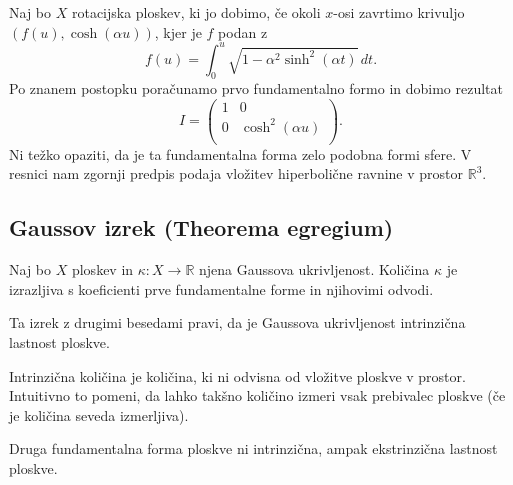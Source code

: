 \begin{primer}
Naj bo $X$ rotacijska ploskev, ki jo dobimo, če okoli $x$-osi zavrtimo krivuljo $(f(u), \cosh (\alpha u))$, kjer je $f$ podan z \begin{equation*}
f(u) = \int_{0}^{u} \sqrt{1 - \alpha^2 \sinh^2(\alpha t)}  \, dt. 
\end{equation*}  
Po znanem postopku poračunamo prvo fundamentalno formo in dobimo rezultat \begin{equation*}
    I = \begin{pmatrix}
        1 & 0\\
        0 & \cosh^2 (\alpha u)\\
    \end{pmatrix}.
\end{equation*}
Ni težko opaziti, da je ta fundamentalna forma zelo podobna formi sfere. V resnici nam zgornji predpis podaja vložitev hiperbolične ravnine v prostor $\mathbb{R}^3$. 
\end{primer}

\subsection{Gaussov izrek (Theorema egregium)}

\begin{izrek}
\label{izr_theorema_egregium}
Naj bo $X$ ploskev in $\kappa: X \to  \mathbb{R}$ njena Gaussova ukrivljenost. Količina $\kappa$ je izrazljiva s koeficienti
prve fundamentalne forme in njihovimi odvodi.
\end{izrek}

\begin{opomba}
Ta izrek z drugimi besedami pravi, da je Gaussova ukrivljenost intrinzična lastnost ploskve. 
\end{opomba}

\begin{definicija}
\label{def_intrinzicna_kolicina}
Intrinzična količina je količina, ki ni odvisna od vložitve ploskve v prostor. Intuitivno to pomeni, da lahko takšno količino izmeri vsak prebivalec ploskve (če je količina seveda izmerljiva).
\end{definicija}

\begin{opomba}
Druga fundamentalna forma ploskve ni intrinzična, ampak ekstrinzična lastnost ploskve.
\end{opomba}

